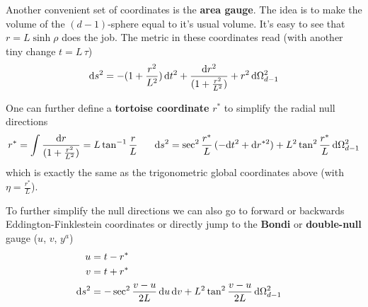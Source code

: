 \documentclass[a4paper,12pt]{article}
\begin{document}
      Another convenient set of coordinates is the \textbf{area gauge}. The idea is to make the volume of the $(d-1)$-sphere equal to it's usual volume. It's easy to see that $r = L \sinh \rho$ does the job. The metric in these coordinates read (with another tiny change $t = L \, \tau$)
      \begin{equation}
         \text{d} s^2 = - (1 + \frac{r^2}{L^2}) \, \text{d} t^2 + \frac{\text{d} r^2}{(1 + \frac{r^2}{L^2})} + r^2 \, \text{d} \Omega_{d-1}^2
      \end{equation}

      One can further define a \textbf{tortoise coordinate} $r^*$ to simplify the radial null directions
      \begin{equation}
         r^* = \int \frac{\d{r}}{(1 + \frac{r^2}{L^2})} = L \tan^{-1}\frac{r}{L} \hspace{0.05\linewidth} \d{s}^2 = \sec^2 \frac{r^*}{L} \, ( -\d{t}^2 +  \d{r^{\ast 2}} ) + L^2 \tan^2 \frac{r^{\ast}}{L} \, \d{\Omega}_{d-1}^2
      \end{equation}
      which is exactly the same as the trigonometric global coordinates above (with $\eta = \frac{r^*}{L}$).

      To further simplify the null directions we can also go to forward or backwards Eddington-Finklestein coordinates or directly jump to the \textbf{Bondi} or \textbf{double-null} gauge ($u$, $v$, $y^a$)
      \begin{align}
         u &= t - r^* \cr
         v &= t + r^* \cr
         \text{d} s^2 &= - \sec^2 \frac{v-u}{2 L} \, \text{d} u \, \text{d} v + L^2 \tan^2 \frac{v-u}{2 L} \, \text{d} \Omega_{d-1}^2
      \end{align}
\end{document}
